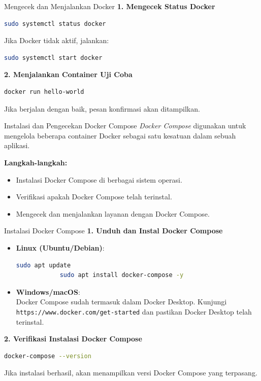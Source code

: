 \documentclass[aspectratio=169, table]{beamer}
\begin{document}
\begin{frame}[fragile]{Mengecek dan Menjalankan Docker}
	\textbf{1. Mengecek Status Docker} \\
	\begin{lstlisting}[language=bash]
		sudo systemctl status docker
	\end{lstlisting}
	Jika Docker tidak aktif, jalankan:
	\begin{lstlisting}[language=bash]
		sudo systemctl start docker
	\end{lstlisting}
	
	\textbf{2. Menjalankan Container Uji Coba} \\
	\begin{lstlisting}[language=bash]
		docker run hello-world
	\end{lstlisting}
	Jika berjalan dengan baik, pesan konfirmasi akan ditampilkan.
\end{frame}

\begin{frame}[fragile]{Instalasi dan Pengecekan Docker Compose}
	\textit{Docker Compose} digunakan untuk mengelola beberapa container Docker sebagai satu kesatuan dalam sebuah aplikasi. 
	
	\textbf{Langkah-langkah:}
	\begin{itemize}
		\item Instalasi Docker Compose di berbagai sistem operasi.
		\item Verifikasi apakah Docker Compose telah terinstal.
		\item Mengecek dan menjalankan layanan dengan Docker Compose.
	\end{itemize}
\end{frame}

\begin{frame}[fragile]{Instalasi Docker Compose}
	\vspace{20pt}
	\textbf{1. Unduh dan Instal Docker Compose} \\
	\begin{itemize}
		\item \textbf{Linux (Ubuntu/Debian)}:
		\begin{lstlisting}[language=bash]
			sudo apt update
			sudo apt install docker-compose -y
		\end{lstlisting}
		\item \textbf{Windows/macOS}: \\
		Docker Compose sudah termasuk dalam Docker Desktop. Kunjungi \texttt{https://www.docker.com/get-started} dan pastikan Docker Desktop telah terinstal.
	\end{itemize}
	
	\textbf{2. Verifikasi Instalasi Docker Compose} \\
	\begin{lstlisting}[language=bash]
		docker-compose --version
	\end{lstlisting}
	Jika instalasi berhasil, akan menampilkan versi Docker Compose yang terpasang.
\end{frame}
\end{document}
